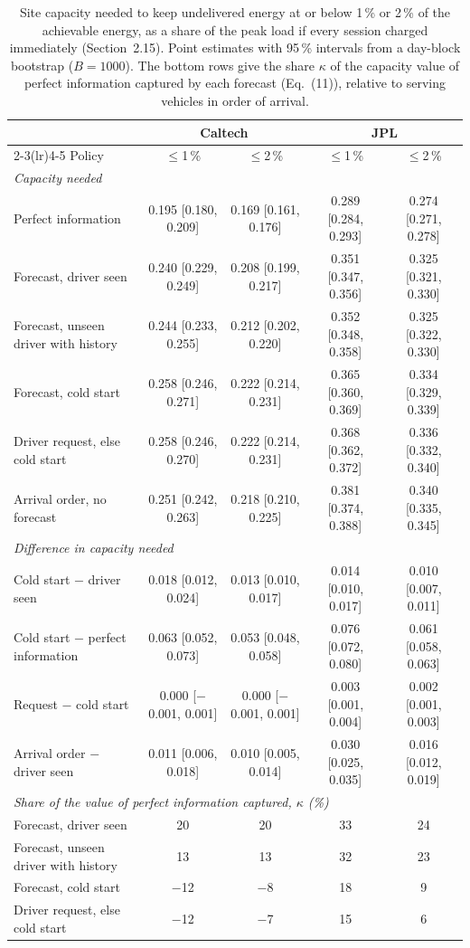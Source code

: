 \begin{table}[H]\centering\scriptsize
\caption{Site capacity needed to keep undelivered energy at or below 1\,\% or 2\,\% of the achievable energy, as a share of the peak load if every session charged immediately (Section~2.15). Point estimates with 95\,\% intervals from a day-block bootstrap ($B=1000$). The bottom rows give the share $\kappa$ of the capacity value of perfect information captured by each forecast (Eq.~(11)), relative to serving vehicles in order of arrival.}\label{tab:s-site}
\begin{tabular}{lcccc}\toprule
 & \multicolumn{2}{c}{Caltech} & \multicolumn{2}{c}{JPL} \\ \cmidrule(lr){2-3}\cmidrule(lr){4-5}
Policy & $\le$1\,\% & $\le$2\,\% & $\le$1\,\% & $\le$2\,\% \\ \midrule
\multicolumn{5}{l}{\emph{Capacity needed}} \\
Perfect information & 0.195 [0.180, 0.209] & 0.169 [0.161, 0.176] & 0.289 [0.284, 0.293] & 0.274 [0.271, 0.278] \\
Forecast, driver seen & 0.240 [0.229, 0.249] & 0.208 [0.199, 0.217] & 0.351 [0.347, 0.356] & 0.325 [0.321, 0.330] \\
Forecast, unseen driver with history & 0.244 [0.233, 0.255] & 0.212 [0.202, 0.220] & 0.352 [0.348, 0.358] & 0.325 [0.322, 0.330] \\
Forecast, cold start & 0.258 [0.246, 0.271] & 0.222 [0.214, 0.231] & 0.365 [0.360, 0.369] & 0.334 [0.329, 0.339] \\
Driver request, else cold start & 0.258 [0.246, 0.270] & 0.222 [0.214, 0.231] & 0.368 [0.362, 0.372] & 0.336 [0.332, 0.340] \\
Arrival order, no forecast & 0.251 [0.242, 0.263] & 0.218 [0.210, 0.225] & 0.381 [0.374, 0.388] & 0.340 [0.335, 0.345] \\
\midrule\multicolumn{5}{l}{\emph{Difference in capacity needed}} \\
Cold start $-$ driver seen & 0.018 [0.012, 0.024] & 0.013 [0.010, 0.017] & 0.014 [0.010, 0.017] & 0.010 [0.007, 0.011] \\
Cold start $-$ perfect information & 0.063 [0.052, 0.073] & 0.053 [0.048, 0.058] & 0.076 [0.072, 0.080] & 0.061 [0.058, 0.063] \\
Request $-$ cold start & 0.000 [$-$0.001, 0.001] & 0.000 [$-$0.001, 0.001] & 0.003 [0.001, 0.004] & 0.002 [0.001, 0.003] \\
Arrival order $-$ driver seen & 0.011 [0.006, 0.018] & 0.010 [0.005, 0.014] & 0.030 [0.025, 0.035] & 0.016 [0.012, 0.019] \\
\midrule\multicolumn{5}{l}{\emph{Share of the value of perfect information captured, $\kappa$ (\%)}} \\
Forecast, driver seen & 20 & 20 & 33 & 24 \\
Forecast, unseen driver with history & 13 & 13 & 32 & 23 \\
Forecast, cold start & $-$12 & $-$8 & 18 & 9 \\
Driver request, else cold start & $-$12 & $-$7 & 15 & 6 \\
\bottomrule\end{tabular}\end{table}

